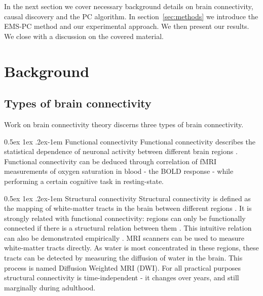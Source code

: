 \documentclass[a4paper, english]{article}
\makeatletter
\renewcommand{\paragraph}{%
  \@startsection{paragraph}{4}%
  {\z@}{0.5ex \@plus 1ex \@minus .2ex}{-1em}%
  {\normalfont\normalsize\bfseries}%
}
\makeatother
\begin{document}
In the next section we cover necessary background details on brain connectivity, causal discovery and the PC algorithm.
In section~\ref{sec:methods} we introduce the EMS-PC method and our experimental approach.
We then present our results.
We close with a discussion on the covered material.

\section{Background}
\subsection{Types of brain connectivity}
Work on brain connectivity theory discerns three types of brain connectivity.

\paragraph{Functional connectivity}
Functional connectivity describes the statistical dependence of neuronal activity between different brain regions \cite{friston1993functional}.
Functional connectivity can be deduced through correlation of fMRI measurements of oxygen saturation  in blood - the BOLD response - while performing a certain cognitive task in resting-state.

\paragraph{Structural connectivity}
Structural connectivity is defined as the mapping of white-matter tracts in the brain between different regions \cite{friston1994}.
It is strongly related with functional connectivity: regions can only be functionally connected if there is a structural relation between them \cite{cabral2012}.
This intuitive relation can also be demonstrated empirically \cite{vandenheuvel2009}.
MRI scanners can be used to measure white-matter tracts directly.
As water is most concentrated in these regions, these tracts can be detected by measuring the diffusion of water in the brain.
This process is named Diffusion Weighted MRI (DWI).
For all practical purposes structural connectivity is time-independent - it changes over years, and still marginally during adulthood.
\end{document}
